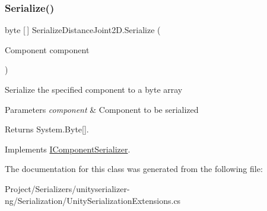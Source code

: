 \subsubsection{\texorpdfstring{Serialize()}{Serialize()}}
{\footnotesize\ttfamily byte \mbox{[}$\,$\mbox{]} Serialize\+Distance\+Joint2\+D.\+Serialize (\begin{DoxyParamCaption}\item[{Component}]{component }\end{DoxyParamCaption})\hspace{0.3cm}{\ttfamily [inline]}}



Serialize the specified component to a byte array 


\begin{DoxyParams}{Parameters}
{\em component} & Component to be serialized\\
\hline
\end{DoxyParams}
\begin{DoxyReturn}{Returns}
System.\+Byte\mbox{[}\mbox{]}.
\end{DoxyReturn}


Implements \hyperlink{interface_i_component_serializer_ab2aa38005665496b62d6c54b5f0dbd31}{I\+Component\+Serializer}.



The documentation for this class was generated from the following file\+:\begin{DoxyCompactItemize}
\item 
Project/\+Serializers/unityserializer-\/ng/\+Serialization/Unity\+Serialization\+Extensions.\+cs\end{DoxyCompactItemize}
